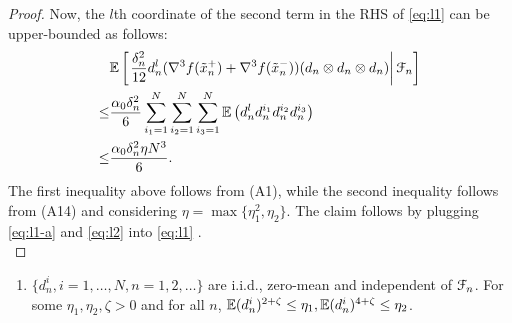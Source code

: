 \begin{proof}
Now, the $l$th coordinate of the second term in the RHS of \eqref{eq:l1} can be upper-bounded as follows:
\begin{align}
&\mathbb{E}\left[\left.\frac{\delta_n^2}{12} d_n^l (\nabla^3 f(\tilde  x_n^+)+\nabla^3 f(\tilde  x_n^-))(d_n \otimes d_n \otimes d_n)\right| \mathcal{F}_n\right]\nonumber\\
\le & \dfrac{\alpha_0 \delta_n^2}{6} \sum_{i_1=1}^N\sum_{i_2=1}^N\sum_{i_3=1}^N \mathbb{E}\left( d_n^l d_n^{i_1} d_n^{i_2} d_n^{i_3}\right)\nonumber\\
\le & \dfrac{\alpha_0 \delta_n^2\eta N^3}{6}.\label{eq:l2}
\end{align}
The first inequality above follows from (A1), while the second inequality follows from (A14) and considering $\eta = \max \{\eta_1^2, \eta_2\}$. The claim follows by plugging \eqref{eq:l1-a} and \eqref{eq:l2} into \eqref{eq:l1} .\\
\end{proof}

\begin{enumerate}[label=(\textbf{C\arabic*}),resume]
\item $\{d_n^i, i=1,\ldots,N, n=1,2,\ldots\}$ are i.i.d., zero-mean and independent of $\mathcal{F}_n$. For some $\eta_1,\eta_2,\zeta >0$ and for all $n$, $\mathbb{E}(d_n^i)^{2+\zeta} \le \eta_1,\mathbb{E}(d_n^i)^{4+\zeta} \le \eta_2$.
\end{enumerate}


